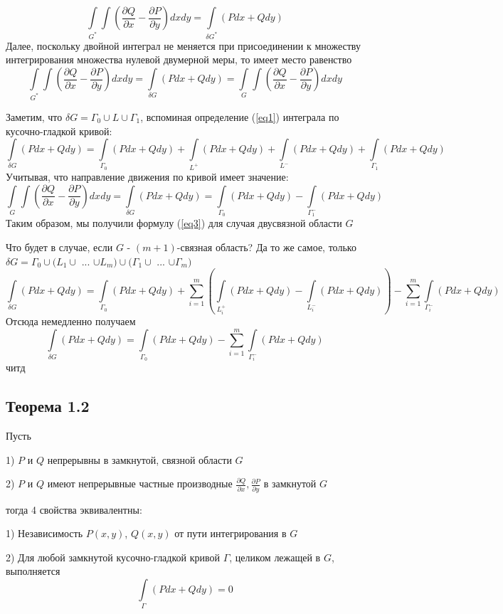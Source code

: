 \documentclass[12pt]{article}
\begin{document}
$$
\int\limits_{G^*} \int (\frac{\partial Q}{\partial x} 
-
\frac{\partial P}{\partial y}) dxdy 
=
\int\limits_{\delta G^*} (Pdx + Qdy)
$$	
Далее, поскольку двойной интеграл не меняется при присоединении к множеству интегрирования множества нулевой двумерной меры, то имеет место равенство
$$
\int\limits_{G^*} \int (\frac{\partial Q}{\partial x} 
-
\frac{\partial P}{\partial y}) dxdy 
=
\int\limits_{\delta G} (Pdx + Qdy)
= 
\int\limits_{G} \int (\frac{\partial Q}{\partial x} 
-
\frac{\partial P}{\partial y}) dxdy 
$$

Заметим, что $\delta G = \Gamma_0 \cup L \cup \Gamma_1$, вспоминая определение (\ref{eq1}) интеграла по кусочно-гладкой кривой:
$$
\int\limits_{\delta G} (Pdx + Qdy)
=
\int\limits_{\Gamma_0} (Pdx + Qdy)
+
\int\limits_{L^+} (Pdx + Qdy)
+
\int\limits_{L^-} (Pdx + Qdy)
+
\int\limits_{\Gamma_1} (Pdx + Qdy)
$$
Учитывая, что направление движения по кривой имеет значение:
$$
\int\limits_{G} \int (\frac{\partial Q}{\partial x} 
-
\frac{\partial P}{\partial y}) dxdy 
=
\int\limits_{\delta G} (Pdx + Qdy)
=
\int\limits_{\Gamma_0} (Pdx + Qdy)
-
\int\limits_{\Gamma_1^-} (Pdx + Qdy)
$$
Таким образом, мы получили формулу (\ref{eq3}) для случая двусвязной области $G$

Что будет в случае, если $G$ - $(m+1)$-связная область?
Да то же самое, только 
$\delta G = \Gamma_0 \cup (L_1 \cup$ ... $ \cup L_m)\cup (\Gamma_1 \cup$ ... $\cup\Gamma_m)$
$$
\int\limits_{\delta G} (Pdx + Qdy)
=
\int\limits_{\Gamma_0} (Pdx + Qdy)
+
\sum_{i = 1}^m (\int\limits_{L_i^+}(Pdx + Qdy) - \int\limits_{L_i^-} (Pdx + Qdy))
-
\sum_{i = 1}^m \int\limits_{\Gamma_i^-} (Pdx + Qdy)
$$
Отсюда немедленно получаем
$$
\int\limits_{\delta G} (Pdx + Qdy)
=
\int\limits_{\Gamma_0} (Pdx + Qdy)
-
\sum_{i = 1}^m \int\limits_{\Gamma_i^-} (Pdx + Qdy)
$$
читд

\subsection{Теорема 1.2}

Пусть

1)  $P$ и $Q$ непрерывны в замкнутой, связной области $G$


2) $P$ и $Q$ имеют непрерывные частные производные $\frac{\partial Q}{\partial x},\frac{\partial P}{\partial y} $ в замкнутой $G$

тогда 4 свойства эквивалентны:


1) Независимость $P(x,y)$, $Q(x,y)$ от пути интегрирования в $G$

2) Для любой замкнутой кусочно-гладкой кривой $\Gamma$, целиком лежащей в $G$, выполняется
$$
\int\limits_{\Gamma} (Pdx + Qdy) = 0
$$
\end{document}
